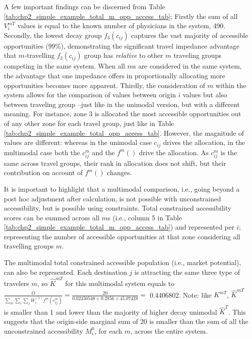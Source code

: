 \documentclass[
11pt, %
oneside, %
english, %
singlespacing, %
]{macthesis} %
\begin{document}


A few important findings can be discerned from Table \ref{tab:chp2_simple_example_total_m_opp_access_tab}; Firstly the sum of all \(V_i^{mT}\) values is equal to the known number of physicians in the system, 490. Secondly, the lowest decay group \(f_3(c_{ij})\) captures the vast majority of accessible opportunities (99\%), demonstrating the significant travel impedance advantage that \(m\)-travelling \(f_3(c_{ij})\) group has \emph{relative} to other \(m\) traveling groups competing in the same system. When all \(m\)s are considered in the same system, the advantage that one impedance offers in proportionally allocating more opportunities becomes more apparent. Thirdly, the consideration of \(m\) within the system allows for the comparison of values between origin \(i\) values but also between traveling group --just like in the unimodal version, but with a different meaning. For instance, zone 3 is allocated the most accessible opportunities out of any other zone for each travel group, just like in Table \ref{tab:chp2_simple_example_total_opp_access_tab}. However, the magnitude of values are different: whereas in the unimodal case \(c_{ij}\) drives the allocation, in the multimodal case both the \(c^m_{ij}\) and the \(f^m()\) drive the allocation. As \(c^m_{ij}\) is the same across travel groups, their rank in allocation does not shift, but their contribution on account of \(f^m()\) changes.

It is important to highlight that a multimodal comparison, i.e., going beyond a post hoc adjustment after calculation, is not possible with unconstrained accessibility, but is possible using constraints. Total constrained accessibility scores can be summed across all \(m\)s (i.e., column 5 in Table \ref{tab:chp2_simple_example_total_m_opp_access_tab}) and represented per \(i\); representing the number of accessible opportunities at that zone considering all travelling groups \(m\).

The multimodal total constrained accessible population (i.e., market potential), can also be represented. Each destination \(j\) is attracting the same three type of travelers \(m\), so \(\hat K^{mT}\) for this multimodal system equals to \(\frac{O}{\sum_m\sum_i\sum_j W^{(1)}_i f^m(c^m_{ij})} = \frac{20}{0.02450548 + 0.2856 + 45.07428}=\) 0.4406802. Note: like \(K^{mT}\), \(\hat K^{mT}\) is smaller than 1 and lower than the majority of higher decay unimodal \(\hat K^T\). This suggests that the origin-side marginal sum of 20 is smaller than the sum of all the unconstrained accessibility \(M^{0}_i\), for each \(m\), across the entire system.
\end{document}
